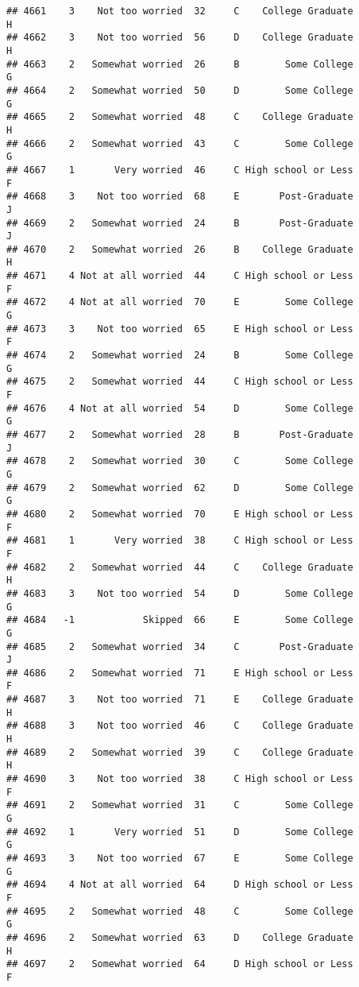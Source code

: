 \documentclass[
]{article}
\begin{document}
\begin{verbatim}
## 4661    3    Not too worried  32     C    College Graduate         H
## 4662    3    Not too worried  56     D    College Graduate         H
## 4663    2   Somewhat worried  26     B        Some College         G
## 4664    2   Somewhat worried  50     D        Some College         G
## 4665    2   Somewhat worried  48     C    College Graduate         H
## 4666    2   Somewhat worried  43     C        Some College         G
## 4667    1       Very worried  46     C High school or Less         F
## 4668    3    Not too worried  68     E       Post-Graduate         J
## 4669    2   Somewhat worried  24     B       Post-Graduate         J
## 4670    2   Somewhat worried  26     B    College Graduate         H
## 4671    4 Not at all worried  44     C High school or Less         F
## 4672    4 Not at all worried  70     E        Some College         G
## 4673    3    Not too worried  65     E High school or Less         F
## 4674    2   Somewhat worried  24     B        Some College         G
## 4675    2   Somewhat worried  44     C High school or Less         F
## 4676    4 Not at all worried  54     D        Some College         G
## 4677    2   Somewhat worried  28     B       Post-Graduate         J
## 4678    2   Somewhat worried  30     C        Some College         G
## 4679    2   Somewhat worried  62     D        Some College         G
## 4680    2   Somewhat worried  70     E High school or Less         F
## 4681    1       Very worried  38     C High school or Less         F
## 4682    2   Somewhat worried  44     C    College Graduate         H
## 4683    3    Not too worried  54     D        Some College         G
## 4684   -1            Skipped  66     E        Some College         G
## 4685    2   Somewhat worried  34     C       Post-Graduate         J
## 4686    2   Somewhat worried  71     E High school or Less         F
## 4687    3    Not too worried  71     E    College Graduate         H
## 4688    3    Not too worried  46     C    College Graduate         H
## 4689    2   Somewhat worried  39     C    College Graduate         H
## 4690    3    Not too worried  38     C High school or Less         F
## 4691    2   Somewhat worried  31     C        Some College         G
## 4692    1       Very worried  51     D        Some College         G
## 4693    3    Not too worried  67     E        Some College         G
## 4694    4 Not at all worried  64     D High school or Less         F
## 4695    2   Somewhat worried  48     C        Some College         G
## 4696    2   Somewhat worried  63     D    College Graduate         H
## 4697    2   Somewhat worried  64     D High school or Less         F

\end{verbatim}
\end{document}
